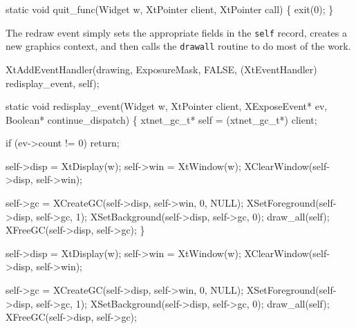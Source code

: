 \nwenddocs{}\plusendmoddef
static void quit_func(Widget w, XtPointer client, XtPointer call)
\{
    exit(0);
\}

\nwendcode{}\nwdocspar

The redraw event simply sets the appropriate fields in the {\tt{}self}
record, creates a new graphics context, and then calls the 
{\tt{}draw{}all} routine to do most of the work.

\nwenddocs{}\plusendmoddef
XtAddEventHandler(drawing, ExposureMask, FALSE,
                  (XtEventHandler) redisplay_event, self);
\nwendcode{}\nwdocspar

\nwenddocs{}\plusendmoddef
static void redisplay_event(Widget w, XtPointer client, XExposeEvent* ev,
                            Boolean* continue_dispatch)
\{
    xtnet_gc_t* self = (xtnet_gc_t*) client;

    if (ev->count != 0)
        return;

    self->disp = XtDisplay(w);
    self->win  = XtWindow(w);
    XClearWindow(self->disp, self->win);

    self->gc = XCreateGC(self->disp, self->win, 0, NULL);
    XSetForeground(self->disp, self->gc, 1);
    XSetBackground(self->disp, self->gc, 0);
    draw_all(self);
    XFreeGC(self->disp, self->gc);
\}

\nwendcode{}\nwdocspar

\nwenddocs{}\endmoddef
self->disp = XtDisplay(w);
self->win  = XtWindow(w);
XClearWindow(self->disp, self->win);

self->gc = XCreateGC(self->disp, self->win, 0, NULL);
XSetForeground(self->disp, self->gc, 1);
XSetBackground(self->disp, self->gc, 0);
draw_all(self);
XFreeGC(self->disp, self->gc);
\nwendcode{}\nwdocspar

